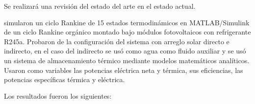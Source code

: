 
Se realizará una revisión del estado del arte en el estado actual.

\textcite{ALVI2020114780} simularon un ciclo Rankine de 15 estados termodinámicos en MATLAB/Simulink de un ciclo Rankine orgánico montado bajo módulos fotovoltaicos con refrigerante R245a. Probaron de la configuración del sistema con arreglo solar directo e indirecto, en el caso del indirecto se usó como agua como fluido auxiliar y se usó un sistema de almacenamiento térmico mediante modelos matemáticos analíticos. Usaron como variables las potencias eléctrica neta y térmica, sus eficiencias, las potencias específicas térmica y eléctrica. 

Los resultados fueron los siguientes:





